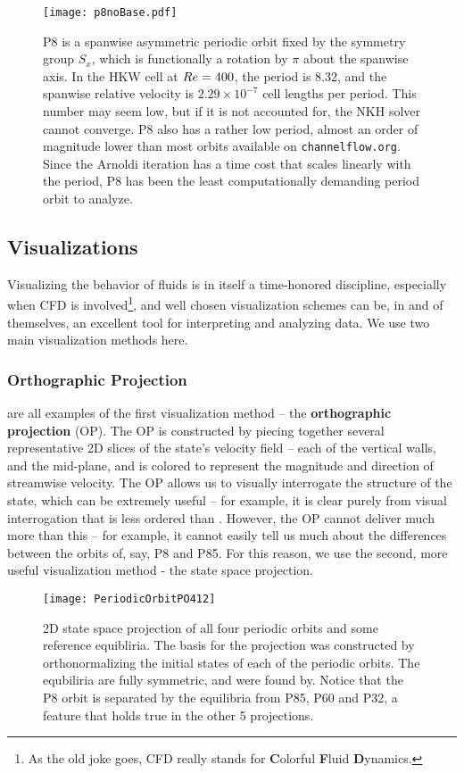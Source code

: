 \begin{figure}
\centerline{\texttt{[image: p8noBase.pdf]}}
\caption{P8 is a spanwise asymmetric periodic orbit fixed by the symmetry group $S_x$, which is functionally a rotation by $\pi$ about the spanwise axis. In the HKW cell at $Re = 400$, the period is 8.32, and the spanwise relative velocity is $2.29\times 10^{-7}$ cell lengths per period. This number may seem low, but if it is not accounted for, the NKH solver cannot converge. P8 also has a rather low period, almost an order of magnitude lower than most orbits available on {\tt channelflow.org}. Since the Arnoldi iteration has a time cost that scales linearly with the period, P8 has been the least computationally demanding period orbit to analyze.}\label{fig:p8}
\end{figure}

\subsection{Visualizations}   

Visualizing the behavior of fluids is in itself a time-honored discipline, especially when CFD is involved\footnote{As the old joke goes, CFD really stands for {\bf C}olorful {\bf F}luid {\bf D}ynamics.}, and well chosen visualization schemes can be, in and of themselves, an excellent tool for interpreting and analyzing data. We use two main visualization methods here.
\subsubsection{Orthographic Projection}
 are all examples of the first visualization method -- the {\bf orthographic projection} (OP). The OP is constructed by piecing together several representative 2D slices of the state's velocity field -- each of the vertical walls, and the mid-plane, and is colored to represent the magnitude and direction of streamwise velocity. The OP allows us to visually interrogate the structure of the state, which can be extremely useful -- for example, it is clear purely from visual interrogation that  is less ordered than . However, the OP cannot deliver much more than this -- for example, it cannot easily tell us much about the differences between the orbits of, say, P8 and P85. For this reason, we use the second, more useful visualization method - the state space projection.

\begin{figure}[h]
\texttt{[image: PeriodicOrbitPO412]}
\caption{2D state space projection of all four periodic orbits and some reference equibliria. The basis for the projection was constructed by orthonormalizing the initial states of each of the periodic orbits. The equbiliria are fully symmetric, and were found by. Notice that the P8 orbit is separated by the equilibria from P85, P60 and P32, a feature that holds true in the other 5 projections.}\label{fig:POStateSpace}
\end{figure}

